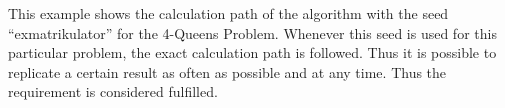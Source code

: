 This example shows the calculation path of the algorithm with the seed \enquote{exmatrikulator} for the 4-Queens Problem. Whenever this seed is used for this particular problem, the exact calculation path is followed. Thus it is possible to replicate a certain result as often as possible and at any time. Thus the requirement is considered fulfilled.
